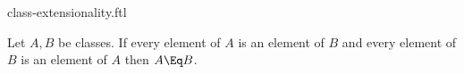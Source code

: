 \documentclass{stex}
\begin{document}
\begin{smodule}{class-extensionality.ftl}


\begin{fakeforthel}
  \begin{axiom}
    Let $A,B$ be classes.
    If every element of $A$ is an element of $B$ and every element of $B$ is an element of $A$ then $A \Eq B$.
  \end{axiom}
\end{fakeforthel}

\end{smodule}
\end{document}
